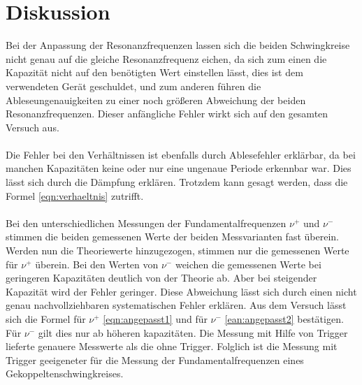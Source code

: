\section{Diskussion}
Bei der Anpassung der Resonanzfrequenzen lassen sich
die beiden Schwingkreise nicht  genau auf die gleiche Resonanzfrequenz
eichen, da sich zum einen die Kapazität nicht auf den
benötigten Wert einstellen lässt, dies ist dem verwendeten Gerät geschuldet,
und zum anderen führen die Ableseungenauigkeiten zu einer
noch größeren Abweichung der beiden Resonanzfrequenzen.
Dieser anfängliche Fehler wirkt sich auf den gesamten Versuch aus.
\\
\\
Die Fehler bei den Verhältnissen ist ebenfalls durch Ablesefehler
erklärbar, da bei manchen Kapazitäten keine oder nur eine ungenaue
Periode erkennbar war. Dies lässt sich durch die Dämpfung erklären.
Trotzdem kann gesagt werden, dass die Formel \eqref{eqn:verhaeltnis}
zutrifft.
\\
\\
Bei den unterschiedlichen Messungen der
Fundamentalfrequenzen $\nu^+ $ und $\nu^-$
stimmen die beiden gemessenen Werte der beiden
Messvarianten fast überein. Werden nun die
Theoriewerte hinzugezogen, stimmen nur die gemessenen Werte
für $\nu^+$ überein. Bei den Werten
von $\nu^-$ weichen
die gemessenen Werte bei geringeren Kapazitäten
deutlich von der Theorie ab. Aber bei steigender
Kapazität wird der Fehler geringer. Diese Abweichung lässt
sich durch einen nicht genau nachvollziehbaren
systematischen Fehler erklären. Aus dem Versuch lässt sich
die Formel für $ \nu^+$ \eqref{eqn:angepasst1}
und für $\nu^-$ \eqref{ean:angepasst2} bestätigen.
Für $\nu^-$ gilt dies nur ab höheren kapazitäten.
Die Messung mit Hilfe von Trigger lieferte genauere Messwerte
als die ohne Trigger. Folglich ist die Messung mit Trigger
geeigeneter für die Messung der Fundamentalfrequenzen
eines Gekoppeltenschwingkreises.


\label{sec:Diskussion}
